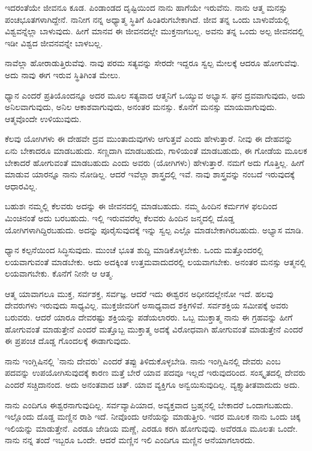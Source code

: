 ಇದರಂತೆಯೇ ಜೀವನೂ ಕೂಡ. ಪಿಂಡಾಂಡದ ದೃಷ್ಟಿಯಿಂದ ನಾನು ಹಾಗೆಯೇ ಇರುವೆನು. ನಾನು ಆತ್ಮ ಮನಸ್ಸು ಪಂಚಭೂತಗಳಾಗಿದ್ದೇನೆ. ನಾನೀಗ ನನ್ನ ಅಧ್ಯಾತ್ಮ ಸ್ಥಿತಿಗೆ ಹಿಂತಿರುಗಬೇಕಾಗಿದೆ. ಜೀವ ತನ್ನ ಒಂದು ಬಾಳುವೆಯಲ್ಲಿ ವಿಶ್ವವನ್ನೆಲ್ಲಾ ಬಾಳುವುದು. ಹೀಗೆ ಮಾನವ ಈ ಜೀವನದಲ್ಲೇ ಮುಕ್ತನಾಗಬಲ್ಲ. ಅವನು ತನ್ನ ಒಂದು ಅಲ್ಪ ಜೀವನದಲ್ಲಿ ಇಡೀ ವಿಶ್ವದ ಜೀವನವನ್ನೇ ಬಾಳಬಲ್ಲ.

ನಾವೆಲ್ಲಾ ಹೋರಾಡುತ್ತಿರುವೆವು. ನಾವು ಪರಮ ಸತ್ಯವನ್ನು ಸೇರದೇ ಇದ್ದರೂ ಸ್ವಲ್ಪ ಮೇಲಕ್ಕೆ ಆದರೂ ಹೋಗುವೆವು. ಅದು ನಾವು ಈಗ ಇರುವ ಸ್ಥಿತಿಗಿಂತ ಮೇಲು.

ಧ್ಯಾನ ಎಂದರೆ ಪ್ರತಿಯೊಂದನ್ನೂ ಅದರ ಮೂಲ ಸತ್ಯವಾದ ಆತ್ಮನಿಗೆ ಒಯ್ಯುವ ಅಭ್ಯಾಸ. ಘನ ದ್ರವವಾಗುವುದು, ಅದು ಅನಿಲವಾಗುವುದು, ಅನಿಲ ಆಕಾಶವಾಗುವುದು, ಅನಂತರ ಮನಸ್ಸು. ಕೊನೆಗೆ ಮನಸ್ಸು ಮಾಯವಾಗುವುದು. ಆತ್ಮವೊಂದೇ ಉಳಿಯುವುದು.

ಕೆಲವು ಯೋಗಿಗಳು ಈ ದೇಹವೇ ದ್ರವ ಮುಂತಾದುವುಗಳು ಆಗುತ್ತವೆ ಎಂದು ಹೇಳುತ್ತಾರೆ. ನೀವು ಈ ದೇಹವನ್ನು ಏನು ಬೇಕಾದರೂ ಮಾಡಬಹುದು. ಸಣ್ಣದಾಗಿ ಮಾಡಬಹುದು, ಗಾಳಿಯಂತೆ ಮಾಡಬಹುದು, ಈ ಗೋಡೆಯ ಮೂಲಕ ಬೇಕಾದರೆ ಹೋಗುವಂತೆ ಮಾಡಬಹುದು ಎಂದು ಅವರು (ಯೋಗಿಗಳು) ಹೇಳುತ್ತಾರೆ. ನಮಗೆ ಅದು ಗೊತ್ತಿಲ್ಲ. ಹೀಗೆ ಮಾಡುವ ಯಾರನ್ನೂ ನಾನು ನೋಡಿಲ್ಲ. ಆದರೆ ಇವೆಲ್ಲಾ ಶಾಸ್ತ್ರದಲ್ಲಿ ಇವೆ. ನಾವು ಶಾಸ್ತ್ರವನ್ನು ನಂಬದೆ ಇರುವುದಕ್ಕೆ ಆಧಾರವಿಲ್ಲ.

ಬಹುಶಃ ನಮ್ಮಲ್ಲಿ ಕೆಲವರು ಅದನ್ನು ಈ ಜೀವನದಲ್ಲಿ ಮಾಡಬಹುದು. ನಮ್ಮ ಹಿಂದಿನ ಕರ್ಮಗಳ ಫಲದಿಂದ ಮಿಂಚಿನಂತೆ ಅದು ಬರಬಹುದು. ಇಲ್ಲಿ ಇರುವವರೆಲ್ಲ ಕೆಲವರು ಹಿಂದಿನ ಜನ್ಮದಲ್ಲಿ ದೊಡ್ಡ ಯೋಗಿಗಳಾಗಿದ್ದಿರಬಹುದು. ಅದನ್ನು ಪೂರೈಸುವುದಕ್ಕೆ ಇನ್ನು ಸ್ವಲ್ಪ ಎಲ್ಲೊ ಮಾಡಬೇಕಾಗಿರಬಹುದು. ಅಭ್ಯಾಸ ಮಾಡಿ.

ಧ್ಯಾನ ಕಲ್ಪನೆಯಿಂದ ಸಿದ್ಧಿಸುವುದು. ಮುಂಚೆ ಭೂತ ಶುದ್ದಿ ಮಾಡಿಕೊಳ್ಳಬೇಕು. ಒಂದು ಮತ್ತೊಂದರಲ್ಲಿ ಲಯವಾಗುವಂತೆ ಮಾಡಬೇಕು. ಅದು ಅದಕ್ಕಿಂತ ಉತ್ತಮವಾದುದರಲ್ಲಿ ಲಯವಾಗಬೇಕು. ಅನಂತರ ಮನಸ್ಸು ಆತ್ಮನಲ್ಲಿ ಲಯವಾಗಬೇಕು. ಕೊನೆಗೆ ನೀನೇ ಆ ಆತ್ಮ.

ಆತ್ಮ ಯಾವಾಗಲೂ ಮುಕ್ತ, ಸರ್ವಶಕ್ತ, ಸರ್ವಜ್ಞ. ಆದರೆ ಇದು ಈಶ್ವರನ ಅಧೀನದಲ್ಲೇನೋ ಇದೆ. ಹಲವು ದೇವರುಗಳು ಇರುವುದು ಸಾಧ್ಯವಿಲ್ಲ. ಮುಕ್ತಜೀವರಿಗೆ ಅಸಾಧ್ಯವಾದ ಶಕ್ತಿಗಳಿವೆ. ಸರ್ವಶಕ್ತಿಯ ಸಮೀಪಕ್ಕೆ ಅವರು ಬರುವರು. ಆದರೆ ಯಾರೂ ದೇವರಷ್ಟು ಶಕ್ತಿಯನ್ನು ಪಡೆಯಲಾರರು. ಒಬ್ಬ ಮುಕ್ತಾತ್ಮ ನಾನು ಈ ಗ್ರಹವನ್ನು ಹೀಗೆ ಹೋಗುವಂತೆ ಮಾಡುತ್ತೇನೆ ಎಂದರೆ ಮತ್ತೊಬ್ಬ ಮುಕ್ತಾತ್ಮ ಅದಕ್ಕೆ ವಿರೋಧವಾಗಿ ಹೋಗುವಂತೆ ಮಾಡುತ್ತೇನೆ ಎಂದರೆ ಈ ಪ್ರಪಂಚ ದೊಡ್ಡ ಗೊಂದಲಕ್ಕೆ ಈಡಾಗುವುದು.

ನಾನು ಇಂಗ್ಲಿಷಿನಲ್ಲಿ 'ನಾನು ದೇವರು' ಎಂದರೆ ತಪ್ಪು ತಿಳಿದುಕೊಳ್ಳಬೇಡಿ. ನಾನು ಇಂಗ್ಲಿಷಿನಲ್ಲಿ ದೇವರು ಎಂಬ ಪದವನ್ನು ಉಪಯೋಗಿಸುವುದಕ್ಕೆ ಕಾರಣ ಮತ್ತೆ ಬೇರೆ ಯಾವ ಪದವೂ ಇಲ್ಲದೆ ಇರುವುದರಿಂದ. ಸಂಸ್ಕೃತದಲ್ಲಿ ದೇವರು ಎಂದರೆ ಸಚ್ಚಿದಾನಂದ. ಅದು ಅನಂತವಾದ ಚಿತ್. ಯಾವ ವ್ಯಕ್ತಿಗೂ ಅನ್ವಯಿಸುವುದಿಲ್ಲ. ವ್ಯಕ್ತ್ಯಾತೀತವಾದುದು ಅದು.

ನಾನು ಎಂದಿಗೂ ಈಶ್ವರನಾಗುವುದಿಲ್ಲ. ಸರ್ವವ್ಯಾಪಿಯಾದ, ಅವ್ಯಕ್ತವಾದ ಬ್ರಹ್ಮನಲ್ಲಿ ಬೇಕಾದರೆ ಒಂದಾಗಬಹುದು. ಇಲ್ಲೊಂದು ದೊಡ್ಡ ಮಣ್ಣಿನ ರಾಶಿ ಇದೆ. ನೀವೊಂದು ಆನೆಯನ್ನು ಮಾಡುತ್ತೀರಿ. ಇದರ ಮೂಲಕ ನಾನು ಒಂದು ಚಿಕ್ಕ ಇಲಿಯನ್ನು ಮಾಡುತ್ತೇನೆ. ಎರಡೂ ಜೇಡಿಯ ಮಣ್ಣೆ, ಎರಡೂ ಕರಗಿ ಹೋಗುವುವು. ಅವೆರಡೂ ಮೂಲತಃ ಒಂದೇ. ನಾನು ನನ್ನ ತಂದೆ ಇಬ್ಬರೂ ಒಂದೇ. ಆದರೆ ಮಣ್ಣಿನ ಇಲಿ ಎಂದಿಗೂ ಮಣ್ಣಿನ ಆನೆಯಾಗಲಾರದು.

